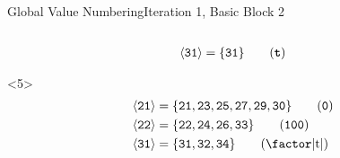 \documentclass{beamer}
\newcommand{\vn}[1]{\ensuremath{\langle\texttt{#1}\rangle}}
\newcommand{\vreg}[1]{\texttt{#1}}
\begin{document}
\begin{frame}[fragile]{Global Value Numbering}{Iteration 1, Basic Block 2}
\begin{columns}[t,onlytextwidth]
\begin{column}{.5\textwidth}
\begin{onlyenv}
\begin{align*}
          \vn{31} &= \{\vreg{31}\}                                  \tag{\texttt{\textbf{t}}} \\
        \end{align*}
      \end{onlyenv}
      \begin{onlyenv}<5>
        \begin{align*}
          \vn{21} &= \{\vreg{21},
                       \vreg{23},
                       \vreg{25},
                       \vreg{27},
                       \vreg{29},
                       \vreg{30}\} \tag{\texttt{0}} \\
          \vn{22} &= \{\vreg{22},
                       \vreg{24},
                       \vreg{26},
                       \vreg{33}\} \tag{\texttt{100}} \\
          \vn{31} &= \{\vreg{31},
                       \vreg{32},
                       \vreg{34}\} \tag{\text{\factor|t|}}
        \end{align*}
      \end{onlyenv}
    \end{column}
  \end{columns}
\end{frame}
\end{document}
